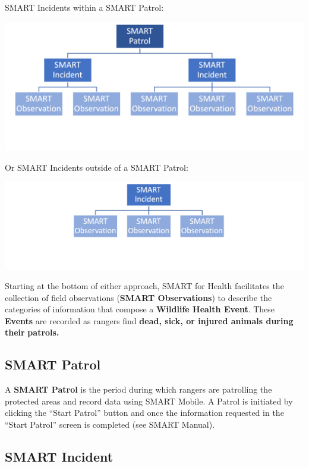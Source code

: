 \documentclass[
  letterpaper,
  DIV=11,
  numbers=noendperiod]{scrreprt}
\begin{document}
SMART Incidents within a SMART Patrol:

\includegraphics{Pictures_for_manual/Picture1.png}

Or SMART Incidents outside of a SMART Patrol:

\includegraphics{Pictures_for_manual/Picture2.png}

Starting at the bottom of either approach, SMART for Health facilitates
the collection of field observations (\textbf{SMART Observations}) to
describe the categories of information that compose a \textbf{Wildlife
Health Event}. These \textbf{Events} are recorded as rangers find
\textbf{dead, sick, or injured animals during their} \textbf{patrols.}

\hypertarget{smart-patrol}{%
\subsection*{SMART Patrol}\label{smart-patrol}}

A \textbf{SMART Patrol} is the period during which rangers are
patrolling the protected areas and record data using SMART Mobile. A
Patrol is initiated by clicking the ``Start Patrol'' button and once the
information requested in the ``Start Patrol'' screen is completed (see
SMART Manual).

\hypertarget{smart-incident}{%
\subsection*{SMART Incident}\label{smart-incident}}
\end{document}

